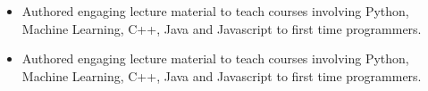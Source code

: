 \documentclass[10pt,a4paper,ragged2e]{altacv}
\begin{document}
\vspace{10px}

\begin{itemize}
  \item Authored engaging lecture material to teach courses involving Python, Machine Learning, C++, Java and Javascript to first time programmers. 
\end{itemize}

\vspace{10px}

\begin{itemize}
  \item Authored engaging lecture material to teach courses involving Python, Machine Learning, C++, Java and Javascript to first time programmers. 
\end{itemize}

\clearpage
\end{document}
